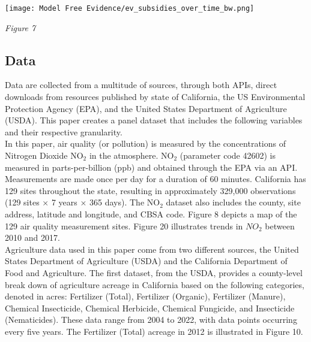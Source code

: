 \documentclass[12pt]{article}
\newcommand\tab[1][.50cm]{\hspace*{#1}}
\begin{document}
	
	
	
	\setcounter{figure}{6}
	\begin{center}
		\texttt{[image: Model Free Evidence/ev\_subsidies\_over\_time\_bw.png]}
		\label{fig:ev_subs_per_month}
	\end{center}
	\begin{center}
		\emph{Figure 7}\\
	\end{center}
	\begin{multicols}{2}
		
		\section*{Data}
		Data are collected from a multitude of sources, through both APIs, direct downloads from resources published by state of California, the US Environmental Protection Agency (EPA), and the United States Department of Agriculture (USDA). This paper creates a panel dataset that includes the following variables and their respective granularity. \\
		\tab In this paper, air quality (or pollution) is measured by the concentrations of Nitrogen Dioxide $\text{NO}_\text{2}$ in the atmosphere. $\text{NO}_\text{2}$ (parameter code 42602) is measured in parts-per-billion (ppb) and obtained through the EPA via an API. Measurements are made once per day for a duration of 60 minutes. California has 129 sites throughout the state, resulting in approximately 329,000 observations (129 sites $\times$ 7 years $\times$ 365 days). The $\text{NO}_\text{2}$ dataset also includes the county, site address, latitude and longitude, and CBSA code. Figure 8 depicts a map of the 129 air quality measurement sites. Figure 20 illustrates trends in $NO_2$ between 2010 and 2017.\\
		\tab  Agriculture data used in this paper come from two different sources, the United States Department of Agriculture (USDA) and the California Department of Food and Agriculture. The first dataset, from the USDA, provides a county-level break down of agriculture acreage in California based on the following categories, denoted in acres: Fertilizer (Total), Fertilizer (Organic), Fertilizer (Manure), Chemical Insecticide, Chemical Herbicide, Chemical Fungicide, and Insecticide (Nematicides). These data range from 2004 to 2022, with data points occurring every five years. The Fertilizer (Total) acreage in 2012 is illustrated in Figure 10.\\

\end{multicols}
\end{document}
